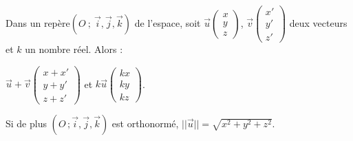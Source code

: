 \begin{proprietes}
  Dans un repère$(O\ ;\ \vec{i},\vec{j},\vec{k})$ de l'espace,
  soit $\vec{u}\begin {pmatrix} x\\y\\z \end{pmatrix}$,
  $\vec{v}\begin {pmatrix} x'\\y'\\z' \end{pmatrix}$ deux vecteurs et
  $k$ un nombre réel. Alors :

  $\vec{u}+\vec{v} \begin {pmatrix} x+x'\\y+y'\\z+z' \end{pmatrix}$ et
  $k \vec{u} \begin {pmatrix} kx\\ky\\kz \end{pmatrix}$.

  Si de plus $(O\,;\vec{i},\vec{j},\vec{k})$ est orthonormé,
  $||\vec{u}||=\sqrt{x^2+y^2+z^2}$.
\end{proprietes}

